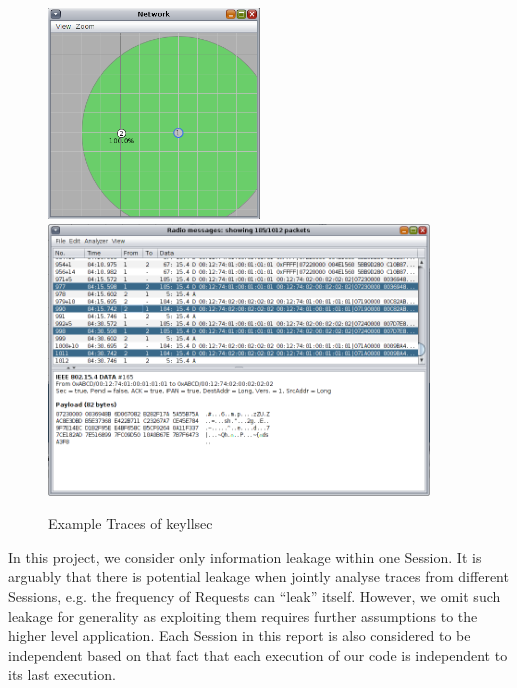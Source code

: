 \begin{figure}[h!]
	\center
	\includegraphics[width=0.5\textwidth]{fig/unicast_keyllsec.png}
	\\
	\includegraphics[width=0.9\textwidth]{fig/trace_keyllsec.png}
	\caption{Example Traces of keyllsec}
	\label{Fig: Example Traces of keyllsec}
\end{figure}

In this project, we consider only information leakage within one Session. It is arguably that there is potential leakage when jointly analyse traces from different Sessions, e.g. the frequency of Requests can ``leak'' itself. However, we omit such leakage for generality as exploiting them requires further assumptions to the higher level application. Each Session in this report is also considered to be independent based on that fact that each execution of our code is independent to its last execution.


